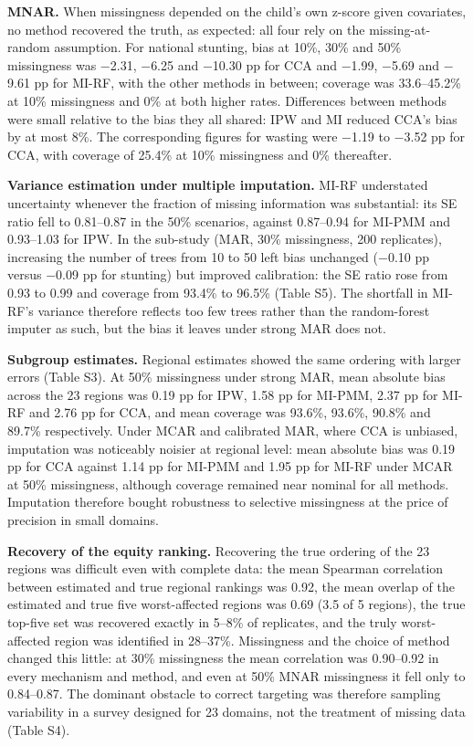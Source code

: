 \documentclass[11pt,a4paper]{article}
\begin{document}
\textbf{MNAR.} When missingness depended on the child's own z-score
given covariates, no method recovered the truth, as expected: all four
rely on the missing-at-random assumption. For national stunting, bias at
10\%, 30\% and 50\% missingness was $-$2.31, $-$6.25 and $-$10.30 pp for CCA
and $-$1.99, $-$5.69 and $-$9.61 pp for MI-RF, with the other methods in
between; coverage was 33.6--45.2\% at 10\% missingness and 0\% at both
higher rates. Differences between methods were small relative to the
bias they all shared: IPW and MI reduced CCA's bias by at most 8\%. The
corresponding figures for wasting were $-$1.19 to $-$3.52 pp for CCA, with
coverage of 25.4\% at 10\% missingness and 0\% thereafter.

\textbf{Variance estimation under multiple imputation.} MI-RF
understated uncertainty whenever the fraction of missing information was
substantial: its SE ratio fell to 0.81--0.87 in the 50\% scenarios,
against 0.87--0.94 for MI-PMM and 0.93--1.03 for IPW. In the sub-study
(MAR, 30\% missingness, 200 replicates), increasing the number of trees
from 10 to 50 left bias unchanged ($-$0.10 pp versus $-$0.09 pp for
stunting) but improved calibration: the SE ratio rose from 0.93 to 0.99
and coverage from 93.4\% to 96.5\% (Table S5). The shortfall in MI-RF's
variance therefore reflects too few trees rather than the random-forest
imputer as such, but the bias it leaves under strong MAR does not.

\textbf{Subgroup estimates.} Regional estimates showed the same ordering
with larger errors (Table S3). At 50\% missingness under strong MAR,
mean absolute bias across the 23 regions was 0.19 pp for IPW, 1.58 pp
for MI-PMM, 2.37 pp for MI-RF and 2.76 pp for CCA, and mean coverage was
93.6\%, 93.6\%, 90.8\% and 89.7\% respectively. Under MCAR and
calibrated MAR, where CCA is unbiased, imputation was noticeably noisier
at regional level: mean absolute bias was 0.19 pp for CCA against 1.14
pp for MI-PMM and 1.95 pp for MI-RF under MCAR at 50\% missingness,
although coverage remained near nominal for all methods. Imputation
therefore bought robustness to selective missingness at the price of
precision in small domains.

\textbf{Recovery of the equity ranking.} Recovering the true ordering of
the 23 regions was difficult even with complete data: the mean Spearman
correlation between estimated and true regional rankings was 0.92, the
mean overlap of the estimated and true five worst-affected regions was
0.69 (3.5 of 5 regions), the true top-five set was recovered exactly in
5--8\% of replicates, and the truly worst-affected region was identified
in 28--37\%. Missingness and the choice of method changed this little:
at 30\% missingness the mean correlation was 0.90--0.92 in every
mechanism and method, and even at 50\% MNAR missingness it fell only to
0.84--0.87. The dominant obstacle to correct targeting was therefore
sampling variability in a survey designed for 23 domains, not the
treatment of missing data (Table S4).
\end{document}
